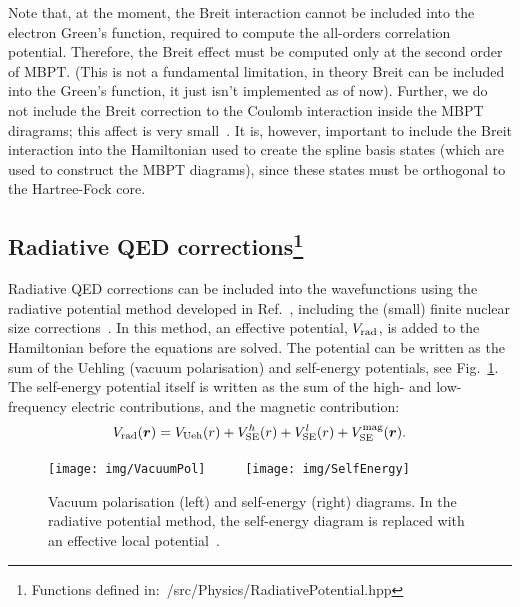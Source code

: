 \documentclass[10pt,twocolumn,a4paper]{article}%
\renewcommand{\v}[1]{\ensuremath{\boldsymbol{#1}}}		%
\newcommand{\be}{\begin{equation}}
\newcommand{\ee}{\end{equation}}
\begin{document}
Note that, at the moment, the Breit interaction cannot be included into the electron Green's function, required to compute the all-orders correlation potential.
Therefore, the Breit effect must be computed only at the second order of MBPT.
(This is not a fundamental limitation, in theory Breit can be included into the Green's function, it just isn't implemented as of now).
Further, we do not include the Breit correction to the Coulomb interaction inside the MBPT diragrams; this affect is very small~\cite{Derevianko2001}.
It is, however, important to include the Breit interaction into the Hamiltonian used to create the spline basis states (which are used to construct the MBPT diagrams), since these states must be orthogonal to the Hartree-Fock core.



\subsection[Radiative QED corrections]{Radiative QED corrections\footnote{Functions defined in:~/src/Physics/RadiativePotential.hpp}}

Radiative QED corrections can be included into the wavefunctions using the radiative potential method developed in Ref.~\cite{FlambaumQED2005}, including the (small) finite nuclear size corrections~\cite{GingesQED2015,Ginges2016}.
In this method, an effective potential, $V_{\rm rad}$,
is added to the Hamiltonian before the equations are solved.
The potential can be written as the sum of the Uehling (vacuum polarisation) and self-energy potentials, see Fig.~\ref{fig:QED}.
The self-energy potential itself is written as the sum of the high- and low-frequency electric contributions, and the magnetic contribution:
\be\label{eq:Vrad}
V_{\rm rad}(\v{r}) = V_{\rm Ueh}(r) + V_{\rm SE}^{h}(r) +  V_{\rm SE}^{l}(r) + V_{\rm SE}^{\rm mag}(\v{r}).
\ee



\begin{figure}%
\centering\tiny
\texttt{[image: img/VacuumPol]}~~~~~
\texttt{[image: img/SelfEnergy]}
\caption{\small Vacuum polarisation (left) and self-energy (right) diagrams. In the radiative potential method, the self-energy diagram is replaced with an effective local potential~\cite{FlambaumQED2005}.\label{fig:QED}}
\end{figure}
\end{document}

